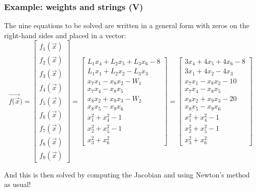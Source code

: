 \documentclass[hyperref={colorlinks=true}]{beamer}
\begin{document}
\begin{frame}%
  \frametitle{Example: weights and strings (V)}

  The nine equations to be solved are written in a general form with zeros on the right-hand sides and placed in a vector:
  \begin{equation}
    \vec{f(\vec{x}}) = \left[\begin{array}{c}
                      f_1(\vec{x}) \\
                      f_2(\vec{x}) \\
                      f_3(\vec{x}) \\
                      f_4(\vec{x}) \\
                      f_5(\vec{x}) \\
                      f_6(\vec{x}) \\
                      f_7(\vec{x}) \\
                      f_8(\vec{x}) \\
                      f_9(\vec{x})        
                    \end{array}\right]
             = \left[\begin{array}{c}
                       L_1 x_4 + L_2 x_5 + L_3 x_6 - 8 \\
                       L_1 x_1 + L_2 x_2 - L_3 x_3 \\
                       x_7 x_1 - x_8 x_2 - W_1 \\
                       x_7 x_4 - x_8 x_5 \\
                       x_8 x_2 + x_9 x_3 - W_2\\
                       x_8 x_5 - x_9 x_6 \\
                       x_1^2 + x_4^2 - 1 \\
                       x_2^2 + x_5^2 - 1 \\
                       x_3^2 + x_6^2 
                     \end{array}\right]  
             = \left[\begin{array}{c}
                       3x_4 + 4x_5 +4x_6 - 8 \\
                       3x_1 + 4x_2 - 4x_3 \\
                       x_7 x_1 - x_8 x_2 - 10 \\
                       x_7 x_4 - x_8 x_5 \\
                       x_8 x_2 + x_9 x_3 - 20 \\
                       x_8 x_5 - x_9 x_6 \\
                       x_1^2 + x_4^2 - 1 \\
                       x_2^2 + x_5^2 - 1 \\
                       x_3^2 + x_6^2 
                     \end{array}\right] \nonumber                 
  \end{equation}

  And this is then solved by computing the Jacobian and using Newton's method as usual!

\end{frame}
\end{document}
